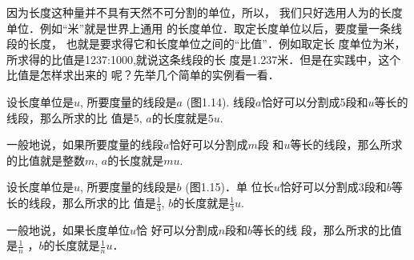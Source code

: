 因为长度这种量并不具有天然不可分割的单位，所以，
我们只好选用人为的长度单位．例如“米”就是世界上通用
的长度单位．取定长度单位以后，要度量一条线段的长度，
也就是要求得它和长度单位之间的“比值”．例如取定长
度单位为米，所求得的比值是1237:1000,就说这条线段的长
度是1.237米．但是在实践中，这个比值是怎样求出来的
呢？先举几个简单的实例看一看．

\begin{example}
设长度单位是$u$, 所要度量的线段是$a$ (图1.14).
线段$a$恰好可以分割成5段和$u$等长的线段，那么所求的比
值是5, $a$的长度就是$5u$. 

一般地说，如果所要度量的线段$a$恰好可以分割成$m$段
和$u$等长的线段，那么所求的比值就是整数$m$, $a$的长度就是$mu$.
\end{example}

\begin{figure}[htp]\centering
    \begin{minipage}[t]{0.48\textwidth}
    \centering
{}
    \caption{}
    \end{minipage}
    \begin{minipage}[t]{0.48\textwidth}
    \centering
    \caption{}
    \end{minipage}
    \end{figure}

\begin{example}
设长度单位是$u$, 所要度量的线段是$b$ (图1.15)．单
位长$u$恰好可以分割成3段和$b$等长的线段，那么所求的比
值是$\frac{1}{3}$, $b$的长度就是$\frac{1}{3}u$. 

一般地说，如果长度单位$u$恰
好可以分割成$n$段和$b$等长的线
段，那么所求的比值是$\frac{1}{n}$
，$b$的长度就是$\frac{1}{n}u$．
\end{example}

